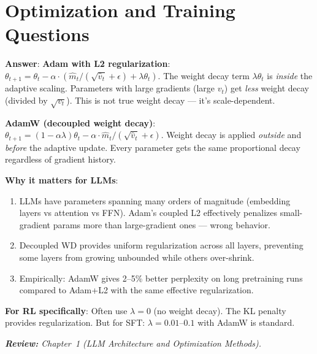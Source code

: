 \section{Optimization and Training Questions}
\label{optimization-and-training-questions}

\begin{questionbox}
\textbf{Answer}: \textbf{Adam with L2 regularization}: $\theta_{t+1} = \theta_t - \alpha \cdot (\hat{m}_t / (\sqrt{\hat{v}_t} + \epsilon) + \lambda\theta_t)$. The weight decay term $\lambda\theta_t$ is \emph{inside} the adaptive scaling. Parameters with large gradients (large $v_t$) get \emph{less} weight decay (divided by $\sqrt{v_t}$). This is not true weight decay --- it’s scale-dependent.

\textbf{AdamW (decoupled weight decay)}: $\theta_{t+1} = (1 - \alpha\lambda)\theta_t - \alpha \cdot \hat{m}_t / (\sqrt{\hat{v}_t} + \epsilon)$. Weight decay is applied \emph{outside} and \emph{before} the adaptive update. Every parameter gets the same proportional decay regardless of gradient history.

\textbf{Why it matters for LLMs}:

\begin{enumerate}
  \item LLMs have parameters spanning many orders of magnitude (embedding layers vs attention vs FFN). Adam’s coupled L2 effectively penalizes small-gradient params more than large-gradient ones --- wrong behavior.
  \item Decoupled WD provides uniform regularization across all layers, preventing some layers from growing unbounded while others over-shrink.
  \item Empirically: AdamW gives 2--5\% better perplexity on long pretraining runs compared to Adam+L2 with the same effective regularization.
\end{enumerate}

\textbf{For RL specifically}: Often use $\lambda = 0$ (no weight decay). The KL penalty provides regularization. But for SFT: $\lambda = 0.01$--$0.1$ with AdamW is standard.

\emph{\textbf{Review:} Chapter~1 (LLM Architecture and Optimization Methods).}
\end{questionbox}

